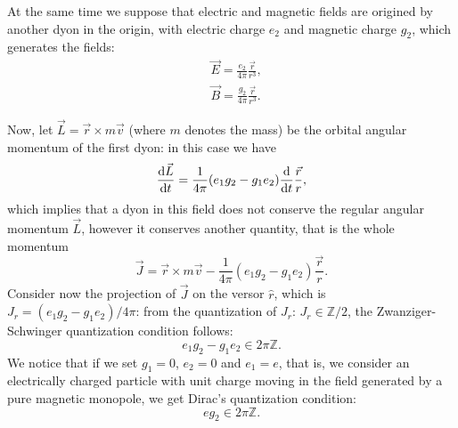 \documentclass[main.tex]{subfiles}
\begin{document}
At the same time we suppose that electric and magnetic fields are origined by another dyon in the origin, with electric charge $e_2$ and magnetic charge $g_2$, which generates the fields:
\begin{align}
&\vec E=\frac{e_2}{4\pi}\frac{\vec r}{r^3},\nonumber\\
&\vec B=\frac{g_2}{4\pi}\frac{\vec r}{r^3}.
\end{align}

Now, let $\vec L=\vec r\times m\vec v$ (where $m$ denotes the mass) be the orbital angular momentum of the first dyon: in this case we have
\begin{equation}
\dv{\vec{L}}{t}
=\frac{1}{4\pi}(e_1g_2-g_1e_2)
\dv{}{t}
\frac{\vec r}{r},
\end{equation}
which implies that a dyon in this field does not conserve the regular angular momentum $\vec L$, however it conserves another quantity, that is the whole momentum
\begin{equation}
\vec J=\vec r\times m\vec v-\frac{1}{4\pi}(e_1g_2-g_1e_2)\frac{\vec r}{r}.
\end{equation}
Consider now the projection of $\vec J$ on the versor $\hat r$, which is $J_r=(e_1g_2-g_1e_2)/4 \pi$: from the quantization of $J_r$: $J_r \in \mathbb Z /2 $, the Zwanziger-Schwinger quantization condition follows:
\begin{equation}
e_1g_2-g_1e_2\in 2 \pi \mathbb{Z}.
\end{equation}
We notice that if we set $g_1=0$, $e_2=0$ and $e_1 = e$, that is, we consider an electrically charged particle with unit charge moving in the field generated by a pure magnetic monopole, we get Dirac's quantization condition:
\begin{equation}
e g_2\in 2 \pi \mathbb{Z}.
\end{equation}

\end{document}
